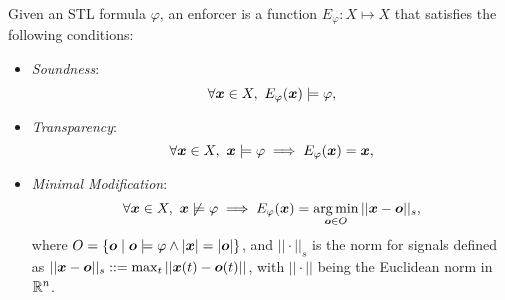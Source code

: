 
    \begin{definition}\label{def:enforcer}
        Given an STL formula $\varphi$, an enforcer is a function $E_{\varphi}:X \mapsto X$ that satisfies the following conditions:
        \begin{itemize}
            \item \emph{Soundness}:
            \[
            \forall \bm{x} \in X,~ E_\varphi(\bm{x})\models \varphi,
            \]
            \item \emph{Transparency}:
            \[
            \forall \bm{x} \in X, ~ \bm{x}\models\varphi \implies  E_\varphi(\bm{x}) = \bm{x},
            \]
            \item \emph{Minimal Modification}:
            \[
            \forall \bm{x} \in X,~ \bm{x}\not\models\varphi \implies E_\varphi(\bm{x}) = \operatorname*{arg\,min}_{\bm{o}\in O}||\bm{x}-\bm{o}||_s,
            \]
            where \(O = \{\bm{o} \mid \bm{o} \models \varphi \land |\bm{x}| = |\bm{o}|\}\), and $||\cdot||_s$ is the norm for signals defined as \(||\bm{x} - \bm{o}||_s \mathrel{::=} \max_t ||\bm{x}(t) - \bm{o}(t)||\), with $||\cdot||$ being the Euclidean norm in \(\mathbb{R}^n\).
        \end{itemize}
    \end{definition}
    
